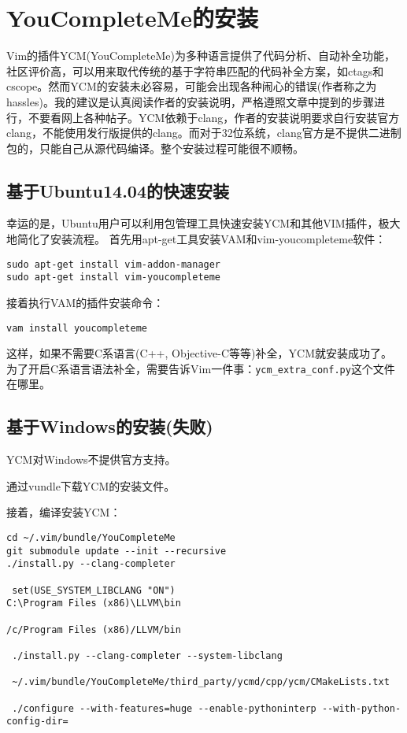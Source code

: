 \section{YouCompleteMe的安装}
Vim的插件YCM(YouCompleteMe)为多种语言提供了代码分析、自动补全功能，社区评价高，可以用来取代传统的基于字符串匹配的代码补全方案，如ctags和cscope。然而YCM的安装未必容易，可能会出现各种闹心的错误(作者称之为hassles)。我的建议是认真阅读作者的安装说明，严格遵照文章中提到的步骤进行，不要看网上各种帖子。YCM依赖于clang，作者的安装说明要求自行安装官方clang，不能使用发行版提供的clang。而对于32位系统，clang官方是不提供二进制包的，只能自己从源代码编译。整个安装过程可能很不顺畅。
\subsection{基于Ubuntu14.04的快速安装}

幸运的是，Ubuntu用户可以利用包管理工具快速安装YCM和其他VIM插件，极大地简化了安装流程。 首先用apt-get工具安装VAM和vim-youcompleteme软件：
\begin{verbatim}
sudo apt-get install vim-addon-manager
sudo apt-get install vim-youcompleteme
\end{verbatim}
接着执行VAM的插件安装命令：
\begin{verbatim}
vam install youcompleteme
\end{verbatim}
这样，如果不需要C系语言(C++, Objective-C等等)补全，YCM就安装成功了。
为了开启C系语言语法补全，需要告诉Vim一件事：\verb$ycm_extra_conf.py$这个文件在哪里。

\subsection{基于Windows的安装(失败)}
YCM对Windows不提供官方支持。

通过vundle下载YCM的安装文件。

接着，编译安装YCM：

\begin{verbatim}
cd ~/.vim/bundle/YouCompleteMe 
git submodule update --init --recursive
./install.py --clang-completer

 set(USE_SYSTEM_LIBCLANG "ON")
C:\Program Files (x86)\LLVM\bin

/c/Program Files (x86)/LLVM/bin

 ./install.py --clang-completer --system-libclang
 
 ~/.vim/bundle/YouCompleteMe/third_party/ycmd/cpp/ycm/CMakeLists.txt
 
 ./configure --with-features=huge --enable-pythoninterp --with-python-config-dir=
 
 \end{verbatim}
















